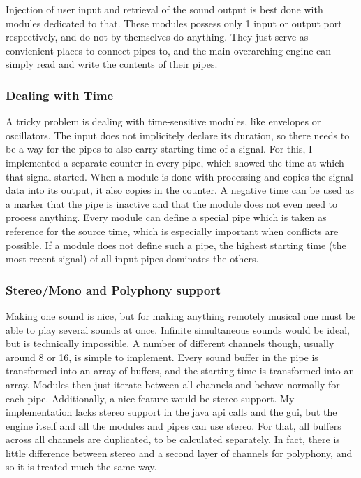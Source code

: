 \documentclass[11pt,a4paper]{article}
\begin{document}
Injection of user input and retrieval of the sound output is best done with modules dedicated to that. These modules possess only 1 input or output port respectively, and do not by themselves do anything. They just serve as convienient places to connect pipes to, and the main overarching engine can simply read and write the contents of their pipes.

\subsubsection{Dealing with Time}

A tricky problem is dealing with time-sensitive modules, like envelopes or oscillators. The input does not implicitely declare its duration, so there needs to be a way for the pipes to also carry starting time of a signal. For this, I implemented a separate counter in every pipe, which showed the time at which that signal started. When a module is done with processing and copies the signal data into its output, it also copies in the counter. A negative time can be used as a marker that the pipe is inactive and that the module does not even need to process anything. Every module can define a special pipe which is taken as reference for the source time, which is especially important when conflicts are possible. If a module does not define such a pipe, the highest starting time (the most recent signal) of all input pipes dominates the others.

\subsubsection{Stereo/Mono and Polyphony support}

Making one sound is nice, but for making anything remotely musical one must be able to play several sounds at once. Infinite simultaneous sounds would be ideal, but is technically impossible. A number of different channels though, usually around 8 or 16, is simple to implement. Every sound buffer in the pipe is transformed into an array of buffers, and the starting time is transformed into an array. Modules then just iterate between all channels and behave normally for each pipe.
Additionally, a nice feature would be stereo support. My implementation lacks stereo support in the java api calls and the gui, but the engine itself and all the modules and pipes can use stereo. For that, all buffers across all channels are duplicated, to be calculated separately. In fact, there is little difference between stereo and a second layer of channels for polyphony, and so it is treated much the same way.
\end{document}
